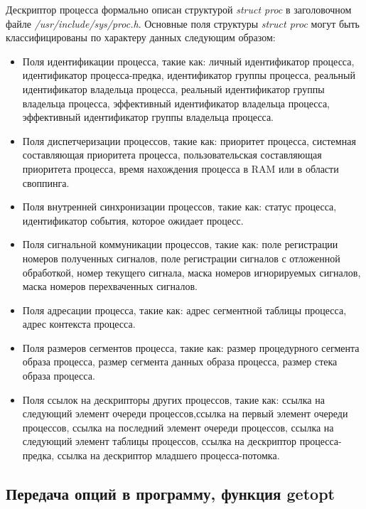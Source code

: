 \documentclass[14pt,a4paper,report]{report}
\begin{document}
Дескриптор процесса формально описан структурой \emph{struct proc} в заголовочном файле \emph{/usr/include/sys/proc.h}. Основные поля структуры \emph{struct proc} могут быть классифицированы по характеру данных следующим образом:

\begin{itemize}
	
	\item Поля идентификации процесса, такие как: личный идентификатор процесса, идентификатор процесса-предка, идентификатор группы процесса, реальный идентификатор владельца процесса, реальный идентификатор группы владельца процесса, эффективный идентификатор владельца процесса, эффективный идентификатор группы владельца процесса.
	
	\item Поля диспетчеризации процессов, такие как: приоритет процесса, системная составляющая приоритета процесса, пользовательская составляющая приоритета процесса, время нахождения процесса в RAM или в области своппинга.
	
	\item Поля внутренней синхронизации процессов, такие как: статус процесса, идентификатор события, которое ожидает процесс.
	
	\item Поля сигнальной коммуникации процессов, такие как: поле регистрации номеров полученных сигналов, поле регистрации сигналов с отложенной обработкой, номер текущего сигнала, маска номеров игнорируемых сигналов, маска номеров перехваченных сигналов.
	
	\item Поля адресации процесса, такие как: адрес сегментной таблицы процесса, адрес контекста процесса.
	
	\item Поля размеров сегментов процесса, такие как: размер процедурного сегмента образа процесса, размер сегмента данных образа процесса, размер стека образа процесса.
	
	\item Поля ссылок на дескрипторы других процессов, такие как: ссылка на следующий элемент очереди процессов,ссылка на первый элемент очереди процессов, ссылка на последний элемент очереди процессов, ссылка на следующий элемент таблицы процессов, ссылка на дескриптор процесса-предка, ссылка на дескриптор младшего процесса-потомка.
	
	
\end{itemize}

\subsection{Передача опций в программу, функция getopt}
\end{document}
